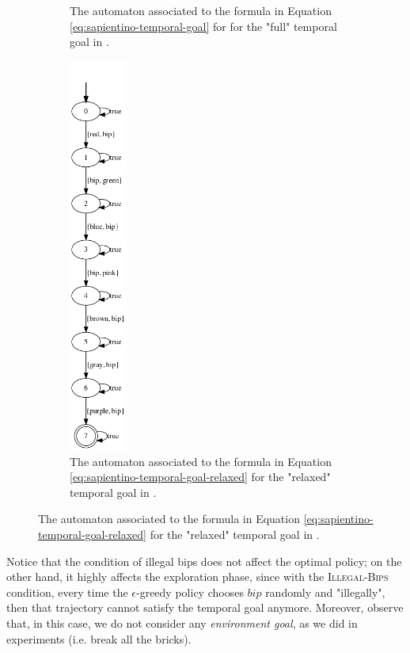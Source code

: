 \begin{figure}[h]
\begin{subfigure}{0.5\textwidth}
		\caption{The automaton associated to the \LDLf formula in Equation \ref{eq:sapientino-temporal-goal} for for the "full" temporal goal in \Sapientino.}
		\label{fig:sapientino-automaton}
	\end{subfigure}
	\begin{subfigure}{0.5\textwidth}
		\centering
		\includegraphics[width=0.21\textwidth]{images/sapientino_ldlf_relaxed.png}
		\caption{The automaton associated to the \LDLf formula in Equation \ref{eq:sapientino-temporal-goal-relaxed} for the "relaxed" temporal goal in \Sapientino.}
		\label{fig:sapientino-relaxed-automaton}
	\end{subfigure}

\end{figure}

Notice that the condition of illegal bips does not affect the optimal policy; on the other hand, it highly affects the exploration phase, since with the \textsc{Illegal-Bips} condition, every time the $\epsilon$-greedy policy chooses $bip$ randomly and "illegally", then that trajectory cannot satisfy the temporal goal anymore.  Moreover, observe that, in this case, we do not consider any \emph{environment goal}, as we did in \Breakout experiments (i.e. break all the bricks).
